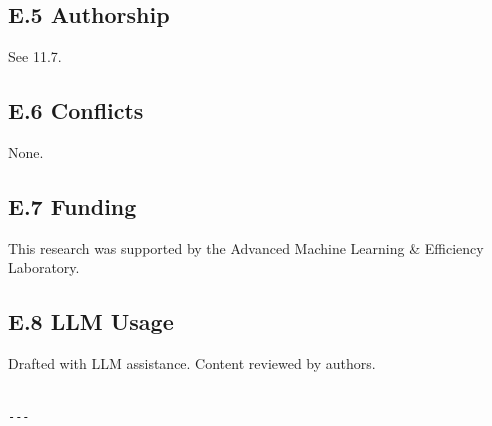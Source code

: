 \subsection{E.5 Authorship}

See  11.7.

\subsection{E.6 Conflicts}

None.

\subsection{E.7 Funding}

This research was supported by the Advanced Machine Learning \& Efficiency Laboratory.

\subsection{E.8 LLM Usage}

Drafted with LLM assistance. Content reviewed by authors.
\begin{lstlisting}

---
\end{lstlisting}